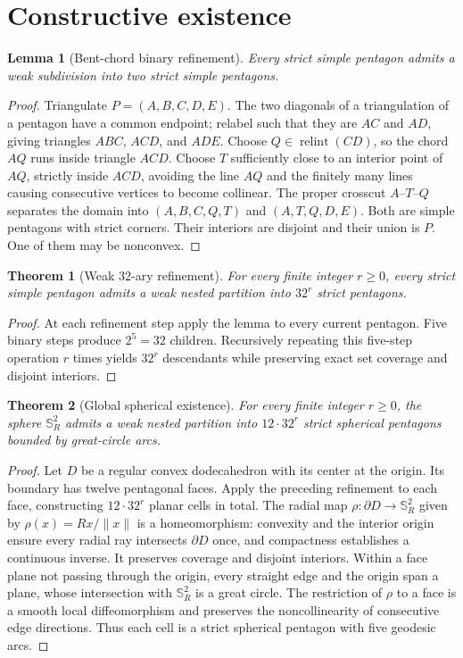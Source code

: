 \documentclass[11pt,a4paper]{article}
\newtheorem{theorem}{Theorem}
\newtheorem{lemma}{Lemma}
\newcommand{\sphere}{\mathbb{S}^{2}_{R}}
\begin{document}
\section{Constructive existence}
\begin{lemma}[Bent-chord binary refinement]
Every strict simple pentagon admits a weak subdivision into two strict
simple pentagons.
\end{lemma}
\begin{proof}
Triangulate $P=(A,B,C,D,E)$. The two diagonals of a triangulation of a
pentagon have a common endpoint; relabel such that they are $AC$ and
$AD$, giving triangles $ABC$, $ACD$, and $ADE$. Choose
$Q\in\operatorname{relint}(CD)$, so the chord $AQ$ runs inside triangle
$ACD$. Choose $T$ sufficiently close to an interior point of $AQ$,
strictly inside $ACD$, avoiding the line $AQ$ and the finitely many
lines causing consecutive vertices to become collinear.
The proper crosscut $A$--$T$--$Q$ separates the domain into
$(A,B,C,Q,T)$ and $(A,T,Q,D,E)$. Both are simple pentagons
with strict corners. Their interiors are disjoint and their union is $P$.
One of them may be nonconvex.
\end{proof}

\begin{theorem}[Weak 32-ary refinement]
For every finite integer $r\geq0$, every strict simple pentagon admits
a weak nested partition into $32^r$ strict pentagons.
\end{theorem}
\begin{proof}
At each refinement step apply the lemma to every current pentagon.
Five binary steps produce $2^5=32$ children. Recursively repeating
this five-step operation $r$ times yields $32^r$ descendants while
preserving exact set coverage and disjoint interiors.
\end{proof}

\begin{theorem}[Global spherical existence]
For every finite integer $r\geq0$, the sphere $\sphere$ admits a
weak nested partition into $12\cdot32^r$ strict spherical
pentagons bounded by great-circle arcs.
\end{theorem}
\begin{proof}
Let $D$ be a regular convex dodecahedron with its center at the
origin. Its boundary has twelve pentagonal faces. Apply the preceding
refinement to each face, constructing $12\cdot32^r$ planar cells in
total. The radial map $\rho:\partial D\to\sphere$ given by
$\rho(x)=Rx/\lVert x\rVert$ is a homeomorphism: convexity and the
interior origin ensure every radial ray intersects $\partial D$
once, and compactness establishes a continuous inverse. It preserves
coverage and disjoint interiors. Within a face plane not passing
through the origin, every straight edge and the origin span a plane,
whose intersection with $\sphere$ is a great circle. The restriction
of $\rho$ to a face is a smooth local diffeomorphism and preserves
the noncollinearity of consecutive edge directions. Thus each cell
is a strict spherical pentagon with five geodesic arcs.
\end{proof}
\end{document}
